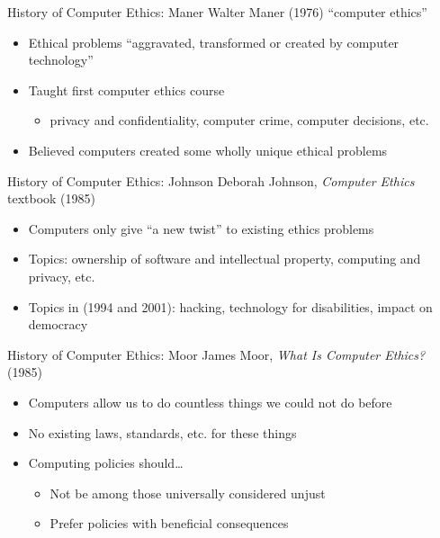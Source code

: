 \documentclass{beamer}
\begin{document}
\begin{frame}{History of Computer Ethics: Maner}
Walter Maner (1976) ``computer ethics''
\begin{itemize}
\item Ethical problems ``aggravated, transformed or created by computer technology''
\item Taught first computer ethics course
\begin{itemize}
\item privacy and confidentiality, computer crime, computer decisions, etc.
\end{itemize}
\item Believed computers created some wholly unique ethical problems
\end{itemize}
\end{frame}

\begin{frame}{History of Computer Ethics: Johnson}
Deborah Johnson, \emph{Computer Ethics} textbook (1985)
\begin{itemize}
\item Computers only give ``a new twist'' to existing ethics problems
\item Topics: ownership of software and intellectual property, computing and privacy, etc.
\item Topics in (1994 and 2001): hacking, technology for disabilities, impact on democracy
\end{itemize}
\end{frame}

\begin{frame}{History of Computer Ethics: Moor}
James Moor, \emph{What Is Computer Ethics?} (1985)
\begin{itemize}
\item Computers allow us to do countless things we could not do before
\item No existing laws, standards, etc. for these things
\item Computing policies should\ldots
\begin{itemize}
\item Not be among those universally considered unjust
\item Prefer policies with beneficial consequences
\end{itemize}
\end{itemize}
\end{frame}
\end{document}
